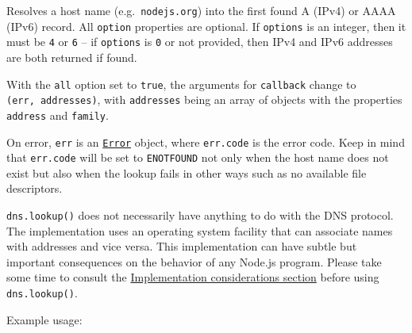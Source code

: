 Resolves a host name
(e.g.~\texttt{\textquotesingle{}nodejs.org\textquotesingle{}}) into the
first found A (IPv4) or AAAA (IPv6) record. All \texttt{option}
properties are optional. If \texttt{options} is an integer, then it must
be \texttt{4} or \texttt{6} -- if \texttt{options} is \texttt{0} or not
provided, then IPv4 and IPv6 addresses are both returned if found.

With the \texttt{all} option set to \texttt{true}, the arguments for
\texttt{callback} change to \texttt{(err,\ addresses)}, with
\texttt{addresses} being an array of objects with the properties
\texttt{address} and \texttt{family}.

On error, \texttt{err} is an
\href{errors.md\#class-error}{\texttt{Error}} object, where
\texttt{err.code} is the error code. Keep in mind that \texttt{err.code}
will be set to \texttt{\textquotesingle{}ENOTFOUND\textquotesingle{}}
not only when the host name does not exist but also when the lookup
fails in other ways such as no available file descriptors.

\texttt{dns.lookup()} does not necessarily have anything to do with the
DNS protocol. The implementation uses an operating system facility that
can associate names with addresses and vice versa. This implementation
can have subtle but important consequences on the behavior of any
Node.js program. Please take some time to consult the
\hyperref[implementation-considerations]{Implementation considerations
section} before using \texttt{dns.lookup()}.

Example usage:

